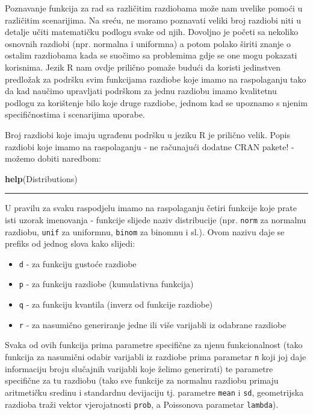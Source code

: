 \documentclass[]{book}
\newenvironment{Shaded}{\begin{snugshade}}{\end{snugshade}}
\newcommand{\KeywordTok}[1]{\textcolor[rgb]{0.13,0.29,0.53}{\textbf{#1}}}
\newcommand{\NormalTok}[1]{#1}
\providecommand{\tightlist}{%
  \setlength{\itemsep}{0pt}\setlength{\parskip}{0pt}}
\theoremstyle{definition}
\theoremstyle{definition}
\theoremstyle{definition}
\theoremstyle{remark}
\begin{document}
Poznavanje funkcija za rad sa različitim razdiobama može nam uvelike
pomoći u različitim scenarijima. Na sreću, ne moramo poznavati veliki
broj razdiobi niti u detalje učiti matematičku podlogu svake od njih.
Dovoljno je početi sa nekoliko osnovnih razdiobi (npr. normalna i
uniformna) a potom polako širiti znanje o ostalim razdiobama kada se
suočimo sa problemima gdje se one mogu pokazati korisnima. Jezik R nam
ovdje prilično pomaže budući da koristi jedinstven predložak za podršku
svim funkcijama razdiobe koje imamo na raspolaganju tako da kad naučimo
upravljati podrškom za jednu razdiobu imamo kvalitetnu podlogu za
korištenje bilo koje druge razdiobe, jednom kad se upoznamo s njenim
specifičnostima i scenarijima uporabe.

Broj razdiobi koje imaju ugrađenu podršku u jeziku R je prilično velik.
Popis razdiobi koje imamo na raspolaganju - ne računajući dodatne CRAN
pakete! - možemo dobiti naredbom:

\begin{Shaded}
\begin{Highlighting}[]
\KeywordTok{help}\NormalTok{(Distributions)}
\end{Highlighting}
\end{Shaded}

\begin{center}\rule{0.5\linewidth}{\linethickness}\end{center}

U pravilu za svaku raspodjelu imamo na raspolaganju četiri funkcije koje
prate isti uzorak imenovanja - funkcije slijede naziv distribucije (npr.
\texttt{norm} za normalnu razdiobu, \texttt{unif} za uniformnu,
\texttt{binom} za binomnu i sl.). Ovom nazivu daje se prefiks od jednog
slova kako slijedi:

\begin{itemize}
\tightlist
\item
  \texttt{d} - za funkciju gustoće razdiobe
\item
  \texttt{p} - za funkciju razdiobe (kumulativna funkcija)
\item
  \texttt{q} - za funkciju kvantila (inverz od funkcije razdiobe)
\item
  \texttt{r} - za nasumično generiranje jedne ili više varijabli iz
  odabrane razdiobe
\end{itemize}

Svaka od ovih funkcija prima parametre specifične za njenu
funkcionalnost (tako funkcija za nasumični odabir varijabli iz razdiobe
prima parametar \texttt{n} koji joj daje informaciju broju slučajnih
varijabli koje želimo generirati) te parametre specifične za tu razdiobu
(tako sve funkcije za normalnu razdiobu primaju aritmetičku sredinu i
standardnu devijaciju tj. parametre \texttt{mean} i \texttt{sd},
geometrijska razdioba traži vektor vjerojatnosti \texttt{prob}, a
Poissonova parametar \texttt{lambda}).
\end{document}
